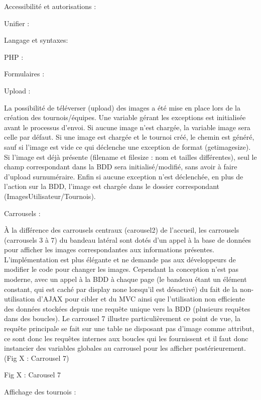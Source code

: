 \documentclass[12pt]{report}
\begin{document}
Accessibilité et autorisations :
\bigskip
\par                
Unifier :
\bigskip
\par                
Langage et syntaxes:
\bigskip
\par  
PHP :
\bigskip
\par            
Formulaires :
\bigskip
\par                
Upload :
\bigskip
\par                
La possibilité de téléverser (upload) des images a été mise en place lors de la création des
tournois/équipes. Une variable gérant les exceptions est initialisée avant le processus d’envoi. Si
aucune image n’est chargée, la variable image sera celle par défaut. Si une image est chargée et le
tournoi créé, le chemin est généré, sauf si l’image est vide ce qui déclenche une exception de format
(getimagesize). Si l’image est déjà présente (filename et filesize : nom et tailles différentes), seul le
champ correspondant dans la BDD sera initialisé/modifié, sans avoir à faire d’upload surnuméraire.
Enfin si aucune exception n’est déclenchée, en plus de l’action sur la BDD, l’image est chargée
dans le dossier correspondant (ImagesUtilisateur/Tournois).
\bigskip
\par    
Carrousels :
\bigskip
\par    
À la différence des carrousels centraux
(carousel2) de l’accueil, les carrousels
(carrousels 3 à 7) du bandeau latéral sont
dotés d’un appel à la base de données pour
afficher les images correspondantes aux
informations présentes. L’implémentation
est plus élégante et ne demande pas aux
développeurs de modifier le code pour
changer les images. Cependant la
conception n’est pas moderne, avec un
appel à la BDD à chaque page (le bandeau
étant un élément constant, qui est caché par
display none lorsqu’il est désactivé) du fait
de la non-utilisation d’AJAX pour cibler et
du MVC ainsi que l’utilisation non
efficiente des données stockées depuis une
requête unique vers la BDD (plusieurs requêtes dans des boucles). Le carrousel 7 illustre particulièrement ce point de vue, la requête
principale se fait sur une table ne disposant pas d’image comme attribut, ce sont donc les requêtes
internes aux boucles qui les fournissent et il faut donc instancier des variables globales au carrousel
pour les afficher postérieurement. (Fig X : Carrousel 7)
\bigskip
\par    
Fig X : Carousel 7
\bigskip
\par    
Affichage des tournois :
\bigskip
\par    
\end{document}

